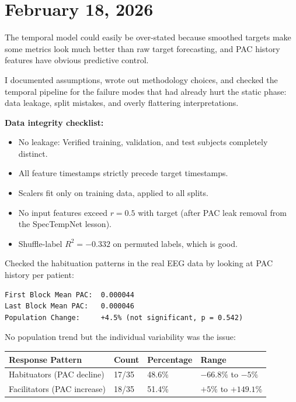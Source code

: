 \documentclass[11pt,letterpaper]{article}
\begin{document}
\section*{February 18, 2026}

The temporal model could easily be over-stated because smoothed targets make some metrics look
much better than raw target forecasting, and PAC history features have obvious predictive
control.

I documented assumptions, wrote out methodology choices, and checked the temporal pipeline for
the failure modes that had already hurt the static phase: data leakage, split mistakes, and
overly flattering interpretations.

\textbf{Data integrity checklist:}
\begin{itemize}[noitemsep]
  \item No leakage: Verified training, validation, and test subjects completely distinct.
  \item All feature timestamps strictly precede target timestamps.
  \item Scalers fit only on training data, applied to all splits.
  \item No input features exceed $r = 0.5$ with target (after PAC leak removal from the
        SpecTempNet lesson).
  \item Shuffle-label $R^2 = -0.332$ on permuted labels, which is good.
\end{itemize}

Checked the habituation patterns in the real EEG data by looking at PAC history per patient:

\begin{verbatim}
First Block Mean PAC:  0.000044
Last Block Mean PAC:   0.000046
Population Change:     +4.5% (not significant, p = 0.542)
\end{verbatim}

No population trend but the individual variability was the issue:

\vspace{0.5em}
\begin{tabular}{@{}llll@{}}
\toprule
\textbf{Response Pattern}    & \textbf{Count} & \textbf{Percentage} & \textbf{Range} \\
\midrule
Habituators (PAC decline)    & 17/35          & 48.6\%              & $-66.8\%$ to $-5\%$ \\
Facilitators (PAC increase)  & 18/35          & 51.4\%              & $+5\%$ to $+149.1\%$ \\
\bottomrule
\end{tabular}
\vspace{0.5em}
\end{document}
